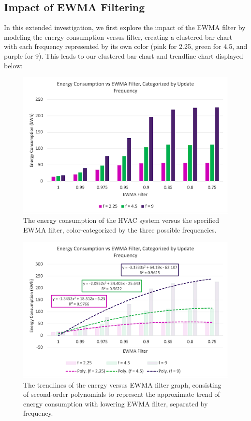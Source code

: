 \documentclass[conference,letterpaper]{IEEEtran}
\begin{document}
\subsection{Impact of EWMA Filtering}
In this extended investigation, we first explore the impact of the EWMA filter by modeling the energy consumption versus filter, creating a clustered bar chart with each frequency represented by its own color (pink for 2.25, green for 4.5, and purple for 9). This leads to our clustered bar chart and trendline chart displayed below:
\begin{figure}[H]
    \includegraphics[scale=0.48]{barewma.png}
    \caption{The energy consumption of the HVAC system versus the specified EWMA filter, color-categorized by the three possible frequencies.}
 \end{figure}   
 \begin{figure}[H]
    \includegraphics[scale=0.48]{lineewma.png}
    \caption{The trendlines of the energy versus EWMA filter graph, consisting of second-order polynomials to represent the approximate trend of energy consumption with lowering EWMA filter, separated by frequency.}
\end{figure}
\end{document}
